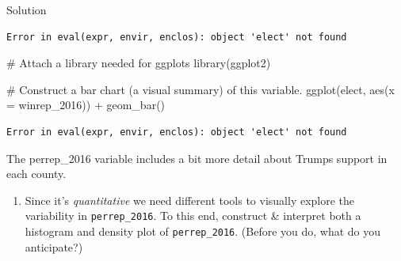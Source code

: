 \documentclass[
  letterpaper,
  DIV=11,
  numbers=noendperiod]{scrreprt}
\newenvironment{Shaded}{\begin{snugshade}}{\end{snugshade}}
\newcommand{\AttributeTok}[1]{\textcolor[rgb]{0.40,0.45,0.13}{#1}}
\newcommand{\CommentTok}[1]{\textcolor[rgb]{0.37,0.37,0.37}{#1}}
\newcommand{\FunctionTok}[1]{\textcolor[rgb]{0.28,0.35,0.67}{#1}}
\newcommand{\NormalTok}[1]{\textcolor[rgb]{0.00,0.23,0.31}{#1}}
\newcommand{\SpecialCharTok}[1]{\textcolor[rgb]{0.37,0.37,0.37}{#1}}
\providecommand{\tightlist}{%
  \setlength{\itemsep}{0pt}\setlength{\parskip}{0pt}}\usepackage{longtable,booktabs,array}
\begin{document}
Solution

\begin{Shaded}
\end{Shaded}

\begin{verbatim}
Error in eval(expr, envir, enclos): object 'elect' not found
\end{verbatim}

\begin{Shaded}
\begin{Highlighting}[]
\CommentTok{\# Attach a library needed for ggplots}
\FunctionTok{library}\NormalTok{(ggplot2)}
\end{Highlighting}
\end{Shaded}

\begin{Shaded}
\begin{Highlighting}[]
\CommentTok{\# Construct a bar chart (a visual summary) of this variable.}
\FunctionTok{ggplot}\NormalTok{(elect, }\FunctionTok{aes}\NormalTok{(}\AttributeTok{x =}\NormalTok{ winrep\_2016)) }\SpecialCharTok{+}
  \FunctionTok{geom\_bar}\NormalTok{()}
\end{Highlighting}
\end{Shaded}

\begin{verbatim}
Error in eval(expr, envir, enclos): object 'elect' not found
\end{verbatim}

\hfill\break

\begin{Shaded}
\begin{Highlighting}[]
\NormalTok{The \textasciigrave{}perrep\_2016\textasciigrave{} variable includes a bit more detail about Trump\textquotesingle{}s support in each county.    }
\end{Highlighting}
\end{Shaded}

\begin{enumerate}
\def\labelenumi{\alph{enumi}.}
\tightlist
\item
  Since it's \emph{quantitative} we need different tools to visually
  explore the variability in \texttt{perrep\_2016}. To this end,
  construct \& interpret both a histogram and density plot of
  \texttt{perrep\_2016}. (Before you do, what do you anticipate?)
\end{enumerate}
\end{document}

